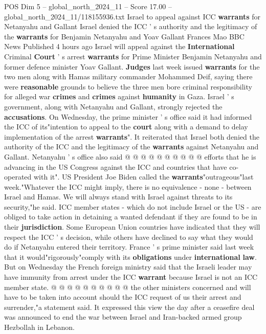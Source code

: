 \begin{textsample}{POS Dim 5 – global\_north\_2024\_11 – Score 17.00 – global\_north\_2024\_11/118155936.txt}  \label{ex:f5_pos_038}
Israel to appeal against ICC \textbf{warrants} for Netanyahu and Gallant Israel denied the ICC ' s authority and the legitimacy of the \textbf{warrants} for Benjamin Netanyahu and Yoav Gallant Frances Mao BBC News Published 4 hours ago Israel will appeal against the \textbf{International} Criminal \textbf{Court} ' s arrest \textbf{warrants} for Prime Minister Benjamin Netanyahu and former defence minister Yoav Gallant. \textbf{Judges} last week issued \textbf{warrants} for the two men along with Hamas military commander Mohammed Deif, saying there were \textbf{reasonable} grounds to believe the three men bore criminal responsibility for alleged war \textbf{crimes} and \textbf{crimes} against \textbf{humanity} in Gaza.
Israel ' s government, along with Netanyahu and Gallant, strongly rejected the \textbf{accusations}.
On Wednesday, the prime minister ' s office said it had informed the ICC of its"intention to appeal to the \textbf{court} along with a demand to delay implementation of the arrest \textbf{warrants}".
It reiterated that Israel both denied the authority of the ICC and the legitimacy of the \textbf{warrants} against Netanyahu and Gallant.
Netanyahu ' s office also said @ @ @ @ @ @ @ @ @ @ efforts that he is advancing in the US Congress against the ICC and countries that have co-operated with it".
US President Joe Biden called the \textbf{warrants}"outrageous"last week."Whatever the ICC might imply, there is no equivalence - none - between Israel and Hamas.
We will always stand with Israel against threats to its security,"he said.
ICC member states - which do not include Israel or the US - are obliged to take action in detaining a wanted defendant if they are found to be in their \textbf{jurisdiction}.
Some European Union countries have indicated that they will respect the ICC ' s decision, while others have declined to say what they would do if Netanyahu entered their territory.
France ' s prime minister said last week that it would"rigorously"comply with its \textbf{obligations} under \textbf{international} \textbf{law}.
But on Wednesday the French foreign ministry said that the Israeli leader may have immunity from arrest under the ICC \textbf{warrant} because Israel is not an ICC member state. @ @ @ @ @ @ @ @ @ @ the other ministers concerned and will have to be taken into account should the ICC request of us their arrest and surrender,"a statement said.
It expressed this view the day after a ceasefire deal was announced to end the war between Israel and Iran-backed armed group Hezbollah in Lebanon.

\end{textsample}
